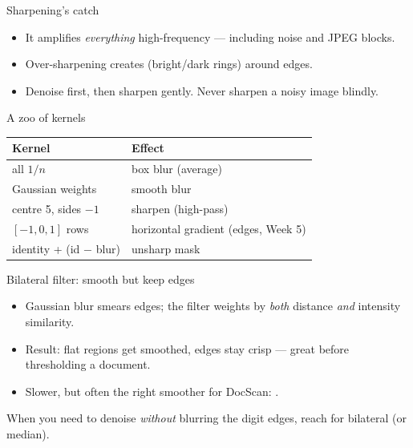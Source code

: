 \documentclass[10pt,aspectratio=169]{beamer}
\begin{document}
\begin{frame}{Sharpening's catch}
  \begin{itemize}
    \item It amplifies \emph{everything} high-frequency — including noise and JPEG blocks.
    \item Over-sharpening creates  (bright/dark rings) around edges.
    \item Denoise first, then sharpen gently. Never sharpen a noisy image blindly.
  \end{itemize}
\end{frame}

\begin{frame}{A zoo of kernels}
  \begin{center}
  \begin{tabular}{@{}ll@{}}
    \toprule
    \textbf{Kernel} & \textbf{Effect} \\
    \midrule
    all $1/n$ & box blur (average) \\
    Gaussian weights & smooth blur \\
    centre 5, sides $-1$ & sharpen (high-pass) \\
    $[-1,0,1]$ rows & horizontal gradient (edges, Week 5) \\
    identity + (id $-$ blur) & unsharp mask \\
    \bottomrule
  \end{tabular}
  \end{center}
\end{frame}

\begin{frame}{Bilateral filter: smooth but keep edges}
  \begin{itemize}
    \item Gaussian blur smears edges; the  filter weights by \emph{both} distance \emph{and} intensity similarity.
    \item Result: flat regions get smoothed, edges stay crisp — great before thresholding a document.
    \item Slower, but often the right smoother for DocScan: .
  \end{itemize}
  \begin{goodbox}
    When you need to denoise \emph{without} blurring the digit edges, reach for bilateral (or median).
  \end{goodbox}
\end{frame}
\end{document}
